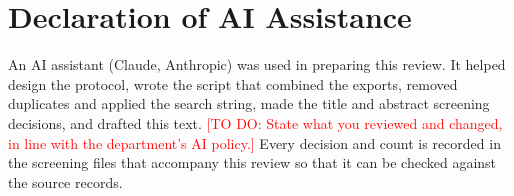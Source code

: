 \documentclass[journal]{IEEEtran}
\newcommand{\todo}[1]{\textcolor{red}{[TO DO: #1]}}
\begin{document}
\section*{Declaration of AI Assistance}

An AI assistant (Claude, Anthropic) was used in preparing this review. It helped design the protocol, wrote the script that combined the exports, removed duplicates and applied the search string, made the title and abstract screening decisions, and drafted this text. \todo{State what you reviewed and changed, in line with the department's AI policy.} Every decision and count is recorded in the screening files that accompany this review so that it can be checked against the source records.



\end{document}
